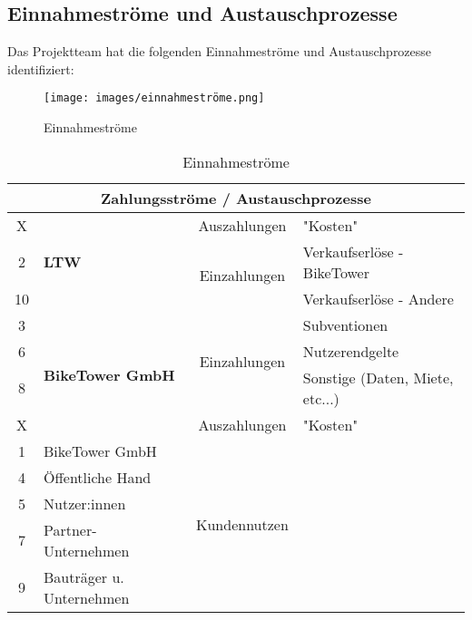 \subsection{Einnahmeströme und Austauschprozesse}

Das Projektteam hat die folgenden Einnahmeströme und Austauschprozesse identifiziert:

\begin{figure}[H]
  \centering
  \texttt{[image: images/einnahmeströme.png]}
  \caption{Einnahmeströme}
  \label{fig:einnahmestroeme}
\end{figure}

\begin{table}[H]
  \centering
  \begin{tabular}{clcl}
    \toprule
    \multicolumn{4}{c}{\textbf{Zahlungsströme / Austauschprozesse}}                                                 \\
    \midrule
    X  & \multirow{3}{*}{\textbf{LTW}}            & Auszahlungen                  & "Kosten"                        \\
    2  &                                          & \multirow{2}{*}{Einzahlungen} & Verkaufserlöse - BikeTower      \\
    10 &                                          &                               & Verkaufserlöse - Andere         \\
    \midrule
    3  & \multirow{4}{*}{\textbf{BikeTower GmbH}} & \multirow{3}{*}{Einzahlungen} & Subventionen                    \\
    6  &                                          &                               & Nutzerendgelte                  \\
    8  &                                          &                               & Sonstige (Daten, Miete, etc...) \\
    X  &                                          & Auszahlungen                  & "Kosten"                        \\
    \midrule
    1  & BikeTower GmbH                           & \multirow{5}{*}{Kundennutzen}                                   \\
    4  & Öffentliche Hand                                                                                           \\
    5  & Nutzer:innen                                                                                               \\
    7  & Partner-Unternehmen                                                                                        \\
    9  & Bauträger u. Unternehmen                                                                                   \\
    \bottomrule
  \end{tabular}
  \caption{Einnahmeströme}
  \label{tab:einnahmestroeme}
\end{table}